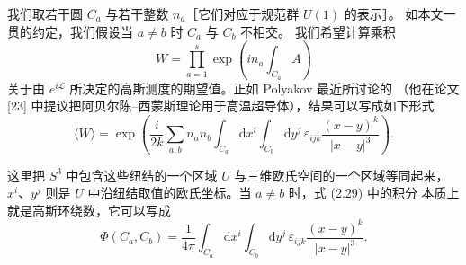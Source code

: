 \documentclass[11pt,a4paper]{article}
\begin{document}
我们取若干圆 $C_a$ 与若干整数 $n_a$［它们对应于规范群 $U(1)$ 的表示］。
如本文一贯的约定，我们假设当 $a\neq b$ 时 $C_a$ 与 $C_b$ 不相交。
我们希望计算乘积
\begin{equation}
    W=\prod_{a=1}^{s}\exp\left(i n_a\int_{C_a}A\right)
    \tag{2.28}
\end{equation}
关于由 $e^{i\mathcal{L}}$ 所决定的高斯测度的期望值。正如 Polyakov 最近所讨论的
（他在论文 [23] 中提议把阿贝尔陈–西蒙斯理论用于高温超导体），结果可以写成如下形式
\begin{equation}
    \langle W\rangle=\exp\left(\frac{i}{2k}\sum_{a,b}n_an_b
    \int_{C_a}\mathrm{d}x^i\int_{C_b}\mathrm{d}y^j\,
    \varepsilon_{ijk}\frac{(x-y)^k}{|x-y|^3}\right).
    \tag{2.29}
\end{equation}


这里把 $S^3$ 中包含这些纽结的一个区域 $U$ 与三维欧氏空间的一个区域等同起来，
$x^i$、$y^j$ 则是 $U$ 中沿纽结取值的欧氏坐标。当 $a\neq b$ 时，式 (2.29) 中的积分
本质上就是高斯环绕数，它可以写成
\begin{equation}
    \Phi(C_a,C_b)=\frac{1}{4\pi}\int_{C_a}\mathrm{d}x^i\int_{C_b}\mathrm{d}y^j\,
    \varepsilon_{ijk}\frac{(x-y)^k}{|x-y|^3}.
    \tag{2.30}
\end{equation}

\end{document}
